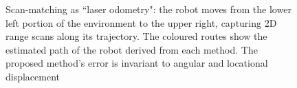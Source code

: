 \begin{figure}[]\centering
  
  \caption{\small Scan-matching as ``laser odometry": the robot moves from the
           lower left portion of the environment to the upper right, capturing
           2D range scans along its trajectory. The coloured routes show the
           estimated path of the robot derived from each method. The proposed
           method's error is invariant to angular and locational displacement}
  \label{}
\end{figure}

\begin{figure}[]\centering
  
  \caption{}
  \label{}
\end{figure}

